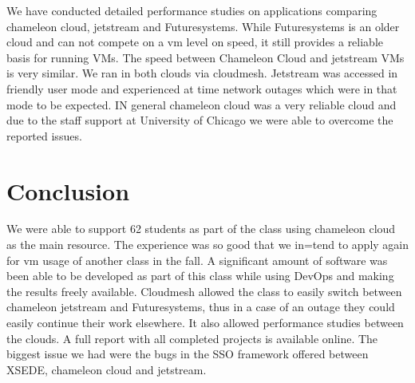 \documentclass[sigconf]{acmart}
\begin{document}
We have conducted detailed performance studies on applications
comparing chameleon cloud, jetstream and Futuresystems. While
Futuresystems is an older cloud and can not compete on a vm level on
speed, it still provides a reliable basis for running VMs. The speed
between Chameleon Cloud and jetstream VMs is very similar. We ran in
both clouds via cloudmesh. Jetstream was accessed in friendly user
mode and experienced at time network outages which were in that mode
to be expected. IN general chameleon cloud was a very reliable cloud
and due to the staff support at University of Chicago we were able to
overcome the reported issues.

\section{Conclusion}

We were able to support 62 students as part of the class using
chameleon cloud as the main resource. The experience was so good that
we in=tend to apply again for vm usage of another class in the fall. A
significant amount of software was been able to be developed as part
of this class while using DevOps and making the results freely
available. Cloudmesh allowed the class to easily switch between
chameleon jetstream and Futuresystems, thus in a case of an outage
they could easily continue their work elsewhere. It also allowed
performance studies between the clouds. A full report with all
completed projects is available online. The biggest issue we had were
the bugs in the SSO framework offered between XSEDE,
chameleon cloud and jetstream.



 
\end{document}
